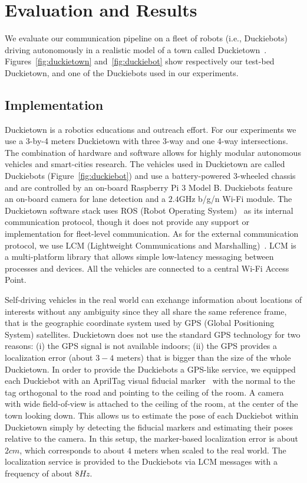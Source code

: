 \section{Evaluation and Results}

We evaluate our communication pipeline on a fleet of robots (i.e., Duckiebots) driving autonomously in a
realistic model of a town called Duckietown~\cite{paull2017duckietown}. Figures~\ref{fig:duckietown}
and~\ref{fig:duckiebot} show respectively our test-bed Duckietown, and one of the Duckiebots used in our
experiments.

\subsection{Implementation}
Duckietown is a robotics educations and outreach effort. For our experiments we use a 3-by-4 meters Duckietown
with three 3-way and one 4-way intersections.
The combination of hardware and software allows for highly modular autonomous vehicles and smart-cities research.
The vehicles used in Duckietown are called Duckiebots (Figure~\ref{fig:duckiebot}) and use a battery-powered 3-wheeled
chassis and are controlled by an on-board Raspberry Pi 3 Model B. Duckiebots feature an on-board camera for lane detection and
a $2.4$GHz b/g/n Wi-Fi module. The Duckietown software stack uses ROS (Robot Operating System)~\cite{quigley2009ros}
as its internal communication protocol, though it does not provide any support or implementation for fleet-level communication.
As for the external communication protocol, we use LCM (Lightweight Communications and Marshalling)~\citep{huang2010lcm}.
LCM is a multi-platform library that allows simple low-latency messaging between processes and devices. All the vehicles are
connected to a central Wi-Fi Access Point.


Self-driving vehicles in the real world can exchange information about locations of interests without any ambiguity since
they all share the same reference frame, that is the geographic coordinate system used by GPS (Global Positioning System) satellites.
Duckietown does not use the standard GPS technology for two reasons: (i) the GPS signal is not available indoors; (ii) the GPS provides
a localization error (about $3-4$ meters) that is bigger than the size of the whole Duckietown.
In order to provide the Duckiebots a GPS-like service, we equipped each Duckiebot with an AprilTag visual fiducial
marker~\cite{olson2011tags} with the normal to the tag orthogonal to the road and pointing to the ceiling of the room.
A camera with wide field-of-view is attached to the ceiling of the room, at the center of the town looking down. This allows
us to estimate the pose of each Duckiebot within Duckietown simply by detecting the fiducial markers and estimating their
poses relative to the camera.
In this setup, the marker-based localization error is about $2cm$, which corresponds to about $4$ meters when scaled to the real world.
The localization service is provided to the Duckiebots via LCM messages with a frequency of about $8Hz$.


